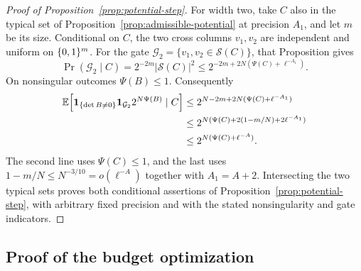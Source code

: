 \begin{proof}[Proof of Proposition~\ref{prop:potential-step}]
For width two, take \(C\) also in the typical set of
Proposition~\ref{prop:admissible-potential} at precision \(A_1\),
and let \(m\) be its size. Conditional on \(C\), the two cross
columns \(v_1,v_2\) are independent and uniform on \(\{0,1\}^m\).
For the gate \(\mathcal G_2=\{v_1,v_2\in\mathcal S(C)\}\), that
Proposition gives
\[
 \Pr(\mathcal G_2\mid C)
 =2^{-2m}|\mathcal S(C)|^2
 \le2^{-2m+2N(\Psi(C)+\ell^{-A_1})}.
\]
On nonsingular outcomes \(\Psi(B)\le1\). Consequently
\[
 \begin{aligned}
 \mathbb E\!\left[\mathbf 1_{\{\det B\ne0\}}\mathbf 1_{\mathcal G_2}
                2^{N\Psi(B)}\mid C\right]
 &\le2^{N-2m+2N(\Psi(C)+\ell^{-A_1})}\\
 &\le2^{N(\Psi(C)+2(1-m/N)+2\ell^{-A_1})}\\
 &\le2^{N(\Psi(C)+\ell^{-A})}.
 \end{aligned}
\]
The second line uses \(\Psi(C)\le1\), and the last uses
\(1-m/N\le N^{-3/10}=o(\ell^{-A})\) together with \(A_1=A+2\).
Intersecting the two typical sets proves both conditional assertions
of Proposition~\ref{prop:potential-step}, with arbitrary fixed
precision and with the stated nonsingularity and gate indicators.
\end{proof}

\subsection{Proof of the budget optimization}

